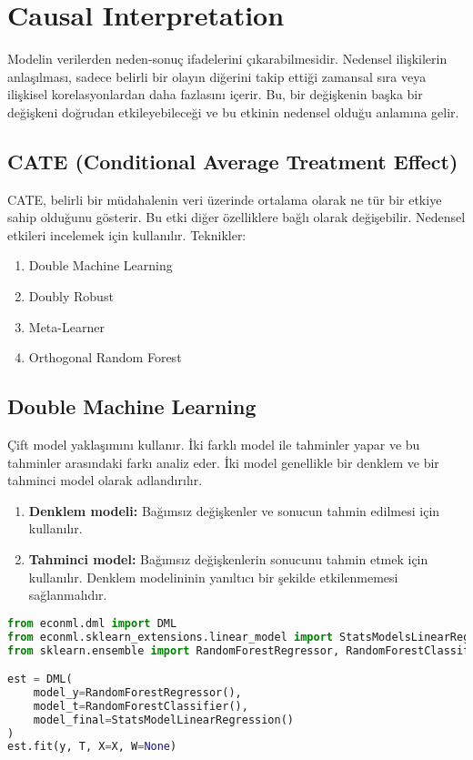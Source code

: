 \section{Causal Interpretation}
Modelin verilerden neden-sonuç ifadelerini çıkarabilmesidir. Nedensel ilişkilerin anlaşılması, sadece belirli bir olayın diğerini takip ettiği zamansal sıra veya ilişkisel korelasyonlardan daha fazlasını içerir. Bu, bir değişkenin başka bir değişkeni doğrudan etkileyebileceği ve bu etkinin nedensel olduğu anlamına gelir.

\subsection{CATE (Conditional Average Treatment Effect)}
CATE, belirli bir müdahalenin veri üzerinde ortalama olarak ne tür bir etkiye sahip olduğunu gösterir. Bu etki diğer özelliklere bağlı olarak değişebilir. Nedensel etkileri incelemek için kullanılır. Teknikler:

\begin{enumerate}
    \item Double Machine Learning
    \item Doubly Robust
    \item Meta-Learner
    \item Orthogonal Random Forest
\end{enumerate}

\subsection{Double Machine Learning}
Çift model yaklaşımını kullanır. İki farklı model ile tahminler yapar ve bu tahminler arasındaki farkı analiz eder. İki model genellikle bir denklem ve bir tahminci model olarak adlandırılır.

\begin{enumerate}
    \item \textbf{Denklem modeli:} Bağımsız değişkenler ve sonucun tahmin edilmesi için kullanılır.
    \item \textbf{Tahminci model:} Bağımsız değişkenlerin sonucunu tahmin etmek için kullanılır. Denklem modelininin yanıltıcı bir şekilde etkilenmemesi sağlanmalıdır.
\end{enumerate}

\begin{lstlisting}[language=Python, caption=ecoml'de DML örneği.]
from econml.dml import DML
from econml.sklearn_extensions.linear_model import StatsModelsLinearRegression
from sklearn.ensemble import RandomForestRegressor, RandomForestClassifier

est = DML(
	model_y=RandomForestRegressor(),
	model_t=RandomForestClassifier(),
	model_final=StatsModelLinearRegression()
)
est.fit(y, T, X=X, W=None)
\end{lstlisting}

